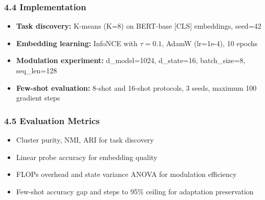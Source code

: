 \subsubsection{4.4 Implementation}

\begin{itemize}
\item \textbf{Task discovery:} K-means (K=8) on BERT-base [CLS] embeddings, seed=42
\item \textbf{Embedding learning:} InfoNCE with $\tau =0.1$, AdamW (lr=1e-4), 10 epochs
\item \textbf{Modulation experiment:} d\_model=1024, d\_state=16, batch\_size=8, seq\_len=128
\item \textbf{Few-shot evaluation:} 8-shot and 16-shot protocols, 3 seeds, maximum 100 gradient steps
\end{itemize}

\subsubsection{4.5 Evaluation Metrics}

\begin{itemize}
\item Cluster purity, NMI, ARI for task discovery
\item Linear probe accuracy for embedding quality
\item FLOPs overhead and state variance ANOVA for modulation efficiency
\item Few-shot accuracy gap and steps to 95\% ceiling for adaptation preservation
\end{itemize}

